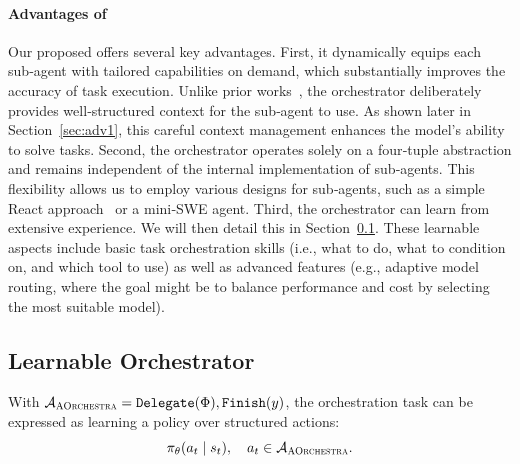 \paragraph{Advantages of \our{}}
Our proposed \our{} offers several key advantages.
First, it dynamically equips each sub‑agent with tailored capabilities on demand, which substantially improves the accuracy of task execution. Unlike prior works~\cite{sun2025scaling, anthropic_claude_code_subagents}, the orchestrator deliberately provides well‑structured context for the sub‑agent to use. As shown later in Section~\ref{sec:adv1}, this careful context management enhances the model’s ability to solve tasks.
Second, the orchestrator operates solely on a four‑tuple abstraction and remains independent of the internal implementation of sub‑agents. This flexibility allows us to employ various designs for sub‑agents, such as a simple React approach~\cite{yao2022react} or a mini‑SWE agent.
Third, the orchestrator can learn from extensive experience. We will then detail this in Section~\ref{sec:learnable}. These learnable aspects include basic task orchestration skills (i.e., what to do, what to condition on, and which tool to use) as well as advanced features (e.g., adaptive model routing, where the goal might be to balance performance and cost by selecting the most suitable model).





\subsection{Learnable Orchestrator}
\label{sec:learnable}

With $\mathcal{A}_{\textsc{AOrchestra}}={\texttt{Delegate}(\Phi),\texttt{Finish}(y)}$, the orchestration task can be expressed as learning a policy over structured actions:
\[
\pi_\theta(a_t \mid s_t),\quad a_t\in\mathcal{A}_{\textsc{AOrchestra}}.
\]

